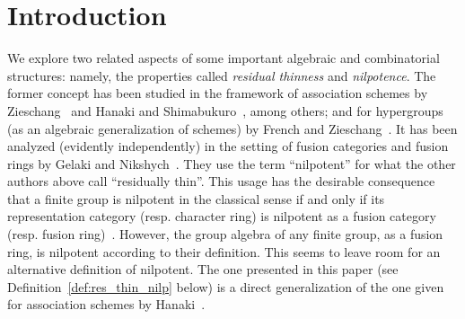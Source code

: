 \section{Introduction}\label{sect1}
We explore two related aspects of
some important algebraic and combinatorial structures: namely, the
properties called \emph{residual thinness} and \emph{nilpotence}. The
former concept has been studied in the framework of association schemes
by Zieschang~\cite{Z1, Z2} and Hanaki and Shimabukuro~\cite{HS},
among others; and for hypergroups (as an algebraic generalization of
schemes) by French and Zieschang~\cite{FZ}. It has been analyzed
(evidently independently) in the setting of fusion categories and fusion
rings by Gelaki and Nikshych~\cite{GN}. They use
the term ``nilpotent'' for what the other authors above call ``residually
thin''. This usage has the desirable consequence that a finite group is
nilpotent in the classical sense if and only if its representation
category (resp. character ring) is nilpotent as a fusion category (resp.
fusion ring)~\cite [Remark~4.7]{GN}.
However, the group algebra of any finite group, as a fusion ring, is nilpotent according to their
definition. This seems to leave room for an alternative definition of
nilpotent. The one presented in this paper (see Definition~\ref{def:res_thin_nilp} below) is a direct generalization of the one
given for association schemes by Hanaki~\cite{H}. 

